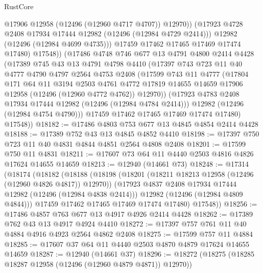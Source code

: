 \begin{lexlean}{RustCore}
\begin{coremodule}
                  @17906
                  @12958
                  (@12496 (@12960 @4717 @4707))
                  @12970))
              (@17923 @4728 @2408 @17934 @17444 @12982 (@12496 (@12984 @4729 @2414)))
              @12982
              (@12496 (@12984 @4699 @4735)))
            @17459
            @17462
            @17465
            @17469
            @17474
            @17480)
          @17548))
      (@17486
        @4748
        @746
        @677
        @13
        @4791
        @4800
        @2414
        @4428
        (@17389
          @745
          @43
          @13
          @4791
          @4798
          @4410
          (@17397
            @743
            @723
            @11
            @40
            @4777
            @4790
            @4797
            @2564
            @4753
            @2408
            (@17599
              @743
              @11
              @4777
              (@17804
                @171
                @64
                @11
                @3194
                @2503
                @4761
                @4772
                @17819
                @14655
                @14659
                @17906
                @12958
                (@12496 (@12960 @4772 @4762))
                @12970))
            (@17923 @4783 @2408 @17934 @17444 @12982 (@12496 (@12984 @4784 @2414)))
            @12982
            (@12496 (@12984 @4754 @4790)))
          @17459
          @17462
          @17465
          @17469
          @17474
          @17480)
        @17548))
@18182 := @17486 @4803 @753 @677 @13 @4845 @4854 @2414 @4428
@18188 := @17389 @752 @43 @13 @4845 @4852 @4410
@18198 := @17397 @750 @723 @11 @40 @4831 @4844 @4851 @2564 @4808 @2408
@18201 := @17599 @750 @11 @4831
@18211 := @17607 @73 @64 @11 @4440 @2503 @4816 @4826 @17624 @14655 @14659
@18213 := @12940 (@14661 @73)
@18248 := @17314
    (@18174
      (@18182
        (@18188
          (@18198
            (@18201 (@18211 @18213 @12958 (@12496 (@12960 @4826 @4817)) @12970))
            (@17923 @4837 @2408 @17934 @17444 @12982 (@12496 (@12984 @4838 @2414)))
            @12982
            (@12496 (@12984 @4809 @4844)))
          @17459
          @17462
          @17465
          @17469
          @17474
          @17480)
        @17548))
@18256 := @17486 @4857 @763 @677 @13 @4917 @4926 @2414 @4428
@18262 := @17389 @762 @43 @13 @4917 @4924 @4410
@18272 := @17397 @757 @761 @11 @40 @4884 @4916 @4923 @2564 @4862 @2408
@18275 := @17599 @757 @11 @4884
@18285 := @17607 @37 @64 @11 @4440 @2503 @4870 @4879 @17624 @14655 @14659
@18287 := @12940 (@14661 @37)
@18296 := @18272 (@18275 (@18285 @18287 @12958 (@12496 (@12960 @4879 @4871)) @12970))

\end{coremodule}
\end{lexlean}
